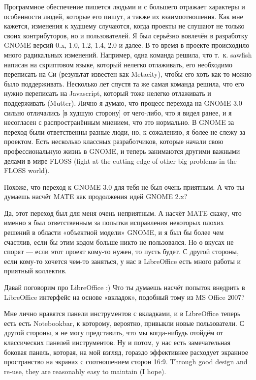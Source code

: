 \documentclass[10pt, a5paper]{article}
\begin{document}
\begin{Parallel}[p]{}{}
{\a Программное обеспечение пишется людьми и с большего отражает характеры и особенности людей, которые его пишут, а также их взаимоотношения. Как мне кажется, изменения к худшему случаются, когда проекты не слушают не только своих контрибуторов, но и пользователей. Я был серьёзно вовлечён в разработку GNOME версий 0.x, 1.0, 1.2, 1.4, 2.0 и далее. В то время в проекте происходило много радикальных изменений. Например, одна команда решила, что т.~к. sawfish написан на скриптовом языке, который нелегко отлаживать, его необходимо переписать на Си (результат известен как Metacity), чтобы его хоть как-то можно было поддерживать. Несколько лет спустя та же самая команда решила, что его нужно переписать на Javascript, который тоже нелегко отлаживать и поддерживать (Mutter). Лично я думаю, что процесс перехода на GNOME 3.0 сильно отличались [в худшую сторону] от чего-либо, что я видел ранее, и я несогласен с распространённым мнением, что это нормально. В GNOME за переход были ответственны разные люди, но, к сожалению, я более не слежу за проектом. Есть несколько классных разработчиков, которые начали свою профессиональную жизнь в GNOME, {\color{red} и теперь занимаются другими важными делами в мире FLOSS (fight at the cutting edge of other big problems in the FLOSS world).}

\q Похоже, что переход к GNOME 3.0 для тебя не был очень приятным. А что ты думаешь насчёт MATE как продолжения идей GNOME 2.x?

\a Да, этот переход был для меня очень неприятным. А насчёт MATE скажу, что именно я был ответственным за попытки исправления некоторых плохих решений в области «объектной модели» GNOME, и я был бы более чем счастлив, если бы этим кодом больше никто не пользовался. Но о вкусах не спорят — если этот проект кому-то нужен, то пусть будет. С другой стороны, если кому-то хочется чем-то заняться, у нас в LibreOffice есть много работы и приятный коллектив.

\q Давай поговорим про LibreOffice :) Что ты думаешь насчёт попыток внедрить в LibreOffice интерфейс на основе «вкладок», подобный тому из MS Office 2007?

\a Мне лично нравятся панели инструментов с вкладками, и в LibreOffice теперь есть есть Notebookbar, к которому, вероятно, привыкли новые пользователи. С другой стороны, я не могу представить, что мы когда-нибудь отойдём от классических панелей инструментов. Ну и потом, у нас есть замечательная боковая панель, которая, на мой взгляд, гораздо эффективнее расходует экранное пространство на экранах с соотношением сторон 16:9. Through good design and re-use, they are reasonably easy to maintain (I hope).

}
\end{Parallel}
\end{document}
